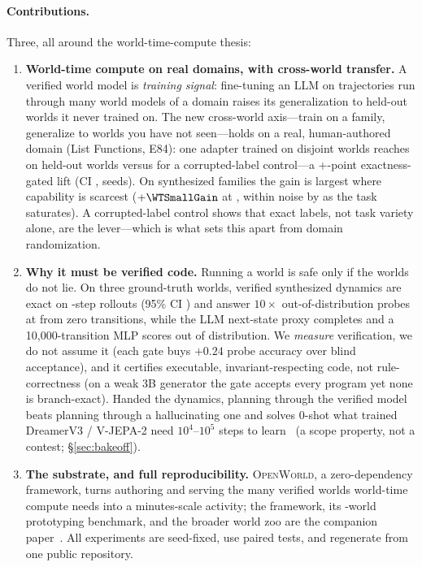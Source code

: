 \documentclass[11pt]{article}
\newcommand{\openworld}{\textsc{OpenWorld}}
\begin{document}
\paragraph{Contributions.} Three, all around the world-time-compute thesis:
\begin{enumerate}
  \item \textbf{World-time compute on real domains, with cross-world transfer.}
  A verified world model is \emph{training signal}: fine-tuning an LLM on trajectories run
  through many world models of a domain raises its generalization to held-out worlds it
  never trained on. The new cross-world axis---train on a family, generalize to worlds you
  have not seen---holds on a real, human-authored domain (List Functions, E84): one adapter trained on
  \CrossWorldNTrain{} disjoint worlds reaches \CrossWorldMean{} on \CrossWorldNEval{} held-out
  worlds versus \CrossWorldCorrupt{} for a corrupted-label control---a \mbox{+\CrossWorldGap}-point
  exactness-gated lift (CI \CrossWorldGapCI{}, \CrossWorldNSeeds{} seeds). On synthesized families
  the gain is largest where capability is scarcest ($+\WTSmallGain$ at \WTSmallName, within noise
  by \WTLargeName{} as the task saturates). A corrupted-label control shows that exact labels,
  not task variety alone, are the lever---which is what sets this apart from domain randomization.
  \item \textbf{Why it must be verified code.} Running a world is safe only if the
  worlds do not lie. On three ground-truth worlds, verified synthesized dynamics are exact on
  \MultiCodeExact{} \RolloutSteps-step rollouts (95\% CI \MultiCodeCI) and answer $10\times$
  out-of-distribution probes at \CodeOODRate{} from zero transitions, while the LLM
  next-state proxy completes \MultiLLMExact{} and a 10{,}000-transition MLP scores \MLPOODTenK{}
  out of distribution. We \emph{measure} verification, we do not assume it (each gate buys $+0.24$ probe
  accuracy over blind acceptance), and it certifies executable, invariant-respecting code, not
  rule-correctness (on a weak 3B generator the gate accepts every program yet none is
  branch-exact). Handed the dynamics, planning through the verified model beats planning through a
  hallucinating one and solves $0$-shot what trained DreamerV3 / V-JEPA-2 need $10^4$--$10^5$
  steps to learn~\cite{dreamerv3} (a scope property, not a contest; \S\ref{sec:bakeoff}).
  \item \textbf{The substrate, and full reproducibility.} \openworld, a zero-dependency framework,
  turns authoring and serving the many verified worlds world-time compute needs into a
  minutes-scale activity; the framework, its \ProtoNumWorlds-world prototyping benchmark, and the
  broader world zoo are the companion paper~\cite{openworld_framework}. All \NumExperiments{}
  experiments are seed-fixed, use paired tests, and regenerate from one public repository.
\end{enumerate}
\end{document}
